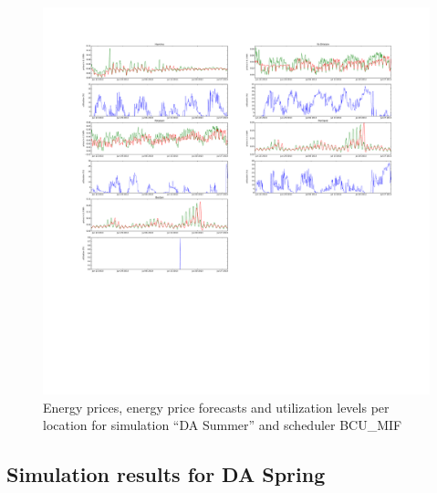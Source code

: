 \begin{figure}[htbp]
	\centering
	\vspace*{-0.6in}
	\hspace*{-1.4in}
		\includegraphics[width=1.60\textwidth]{figures/appendix_simulation_results/DA_Summer_scenario_7.pdf}
	\vspace*{-2.8in}
	\caption{Energy prices, energy price forecasts and utilization levels per location for simulation ``DA Summer'' and scheduler BCU\_MIF}
	\label{fig:app_DA_Summer_scenario_7}
\end{figure}


\FloatBarrier
\subsection{Simulation results for DA Spring}

\newpage

